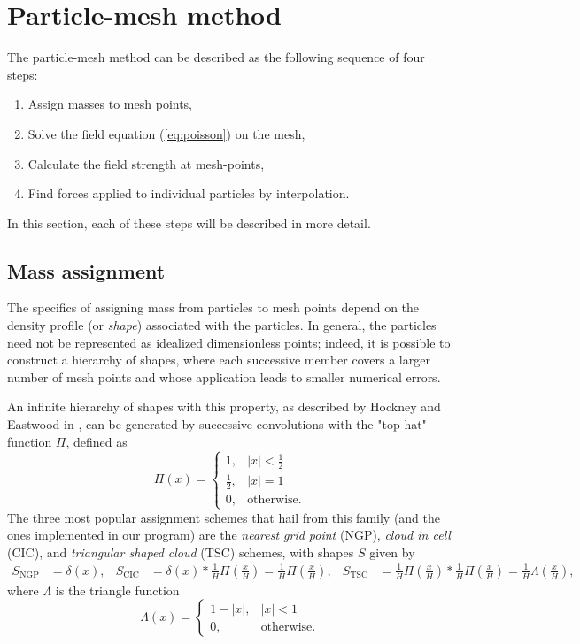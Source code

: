 \section{Particle-mesh method}
The particle-mesh method can be described as the following sequence of four steps:
\begin{enumerate}
    \item Assign masses to mesh points,
    \item Solve the field equation (\autoref{eq:poisson}) on the mesh,
    \item Calculate the field strength at mesh-points,
    \item Find forces applied to individual particles by interpolation.
\end{enumerate}
In this section, each of these steps will be described in more detail.

\subsection{Mass assignment}\label{subsec:mass-assignment}
The specifics of assigning mass from particles to mesh points depend on the density profile (or \textit{shape}) associated with the particles.
In general, the particles need not be represented as idealized dimensionless points;
indeed, it is possible to construct a hierarchy of shapes, where each successive member covers a larger number of mesh points and whose application leads to smaller numerical errors.

An infinite hierarchy of shapes with this property, as described by Hockney and Eastwood in \cite{Hockney1988}, can be generated by successive convolutions with the "top-hat" function $\Pi$, defined as
\begin{equation*}
    \Pi(x) = \begin{cases}
        1,           & |x| < \frac{1}{2} \\
        \frac{1}{2}, & |x| = 1           \\
        0,           & \text{otherwise}.
    \end{cases}
\end{equation*}
The three most popular assignment schemes that hail from this family (and the ones implemented in our program) are the \textit{nearest grid point} (NGP), \textit{cloud in cell} (CIC), and \textit{triangular shaped cloud} (TSC) schemes, with shapes $S$ given by
\begin{align*}
    S_\text{NGP} & = \delta(x), & S_\text{CIC} & = \delta(x) * \frac{1}{H} \Pi\left(\frac{x}{H}\right) = \frac{1}{H}\Pi\left(\frac{x}{H}\right), & S_\text{TSC} & = \frac{1}{H}\Pi\left(\frac{x}{H}\right) * \frac{1}{H}\Pi\left(\frac{x}{H}\right) = \frac{1}{H}\Lambda \left(\frac{x}{H}\right),
\end{align*}
where $\Lambda$ is the triangle function
\begin{equation*}
    \Lambda(x) = \begin{cases}
        1 - |x|, & |x| < 1           \\
        0,       & \text{otherwise}.
    \end{cases}
\end{equation*}

